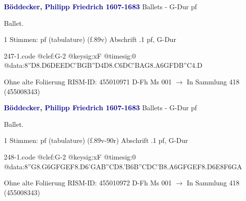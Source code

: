 \documentclass[twocolumn]{book}
\begin{document}
\newline \par \vspace{7pt} \textcolor{darkblue}{\textbf{Böddecker, Philipp Friedrich  1607-1683}}
\newline Ballets - G-Dur
\newline pf
\newline \begin{itshape}[f.89v, at left:] Ballet.\end{itshape} 
\newline \textcolor{darkblue}{}  1 Stimmen: pf (tabulature)  (f.89v)
\newline Abschrift
.1  pf, G-Dur  
\begin{filecontents*}{247-1.code}
@clef:G-2
@keysig:xF
@timesig:0
@data:8''D{8.D6D}{EEDC}{'BGB''D}4D{8.C6D}{C'BAG}{8.A6G}{FDB''C}4.D
\end{filecontents*}
\newline
%
\newline Ohne alte Foliierung
\newline RISM-ID: 455010971
\newline D-Fh  Ms 001
\newline $\rightarrow$ In Sammlung 418 (455008343)
      
\newline \par \vspace{7pt} \textcolor{darkblue}{\textbf{Böddecker, Philipp Friedrich  1607-1683}}
\newline Ballets - G-Dur
\newline pf
\newline \begin{itshape}[f.89v, at left:] Ballet.\end{itshape} 
\newline \textcolor{darkblue}{}  1 Stimmen: pf (tabulature)  (f.89v-90r)
\newline Abschrift
.1  pf, G-Dur  
\begin{filecontents*}{248-1.code}
@clef:G-2
@keysig:xF
@timesig:0
@data:8''G{8.G6G}{FGEF}{8.D6'G}{AB''CD}{8.'B6B}{''CDC'B}{8.A6G}{FGEF}{8.D6E}{8F6GA}
\end{filecontents*}
\newline
%
\newline Ohne alte Foliierung
\newline RISM-ID: 455010972
\newline D-Fh  Ms 001
\newline $\rightarrow$ In Sammlung 418 (455008343)
      
\end{document}
